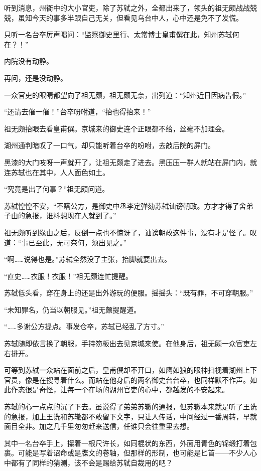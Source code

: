 听到消息，州衙中的大小官吏，除了苏轼之外，全都出来了，领头的祖无颇战战兢兢，虽知今天的事多半跟自己无关，但看见乌台中人，心中还是免不了发慌。

只听一名台卒厉声喝问：“监察御史里行、太常博士皇甫僎在此，知州苏轼何在？！”

内院没有动静。

再问，还是没动静。

一众官吏的眼睛都望向了祖无颇，祖无颇无奈，出列道：“知州近日因病告假。”

“还请去催一催！”台卒吩咐道，“抬也得抬来！”

祖无颇抬眼去看皇甫僎。京城来的御史连个正眼都不给，丝毫不加理会。

湖州通判暗叹了一口气，却只能听着台卒的吩咐，去敲后院的屏门。

黑漆的大门吱呀一声就开了，让祖无颇走了进去。黑压压一群人就站在屏门内，就连苏轼也在其中，人人面色如土。

“究竟是出了何事？”祖无颇问道。

苏轼惶惶不安，“不瞒公方，是御史中丞李定弹劾苏轼讪谤朝政。方才才得了舍弟子由的急报，谁料想现在人就到了。”

祖无颇听到缘由之后，反倒一点也不惊讶了，讪谤朝政这件事，没有才是怪了。叹道：“事已至此，无可奈何，须出见之。”

“啊……说得也是。”苏轼全然没了主张，抬脚就要出去。

“直史……衣服！衣服！”祖无颇连忙提醒。

苏轼低头看，穿在身上的还是出外游玩的便服。摇摇头：“既有罪，不可穿朝服。”

“未知罪名，仍当以朝服见。”祖无颇提醒道。

“……多谢公方提点。事发仓卒，苏轼已经乱了方寸。”

苏轼随即依言换了朝服，手持笏板出去见京城来使。在他身后，祖无颇一众官吏左右排开。

可等到苏轼一众站在面前之后，皇甫僎却不开口，如鹰如狼的眼神扫视着湖州上下官员，像是在搜寻着什么。而站在他身后的两名御史台台卒，也同样默不作声。如此作态很是奇怪，让每一个在场的湖州官吏的心中，都越发的不安起来。

苏轼的心一点点的沉了下去。虽说得了弟弟苏辙的通报，但苏辙本来就是听了王诜的急报，加上王诜和苏辙都不敢留下文字，只让人传话，中间经过一番周转，早就面目全非。加之几千里匆匆赶来送信，任谁只会往重里去想。

其中一名台卒手上，攥着一根尺许长，如同棍状的东西，外面用青色的锦缎打着包裹。可能是写着诏命或是牒文的卷轴，但那样的形制，也可能是匕首——不少人心中都有了同样的猜测，该不会是赐给苏轼自裁用的吧？

